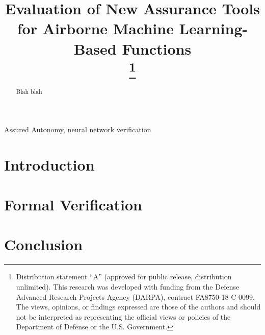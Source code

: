 \documentclass[conference]{IEEEtran}
\begin{document}
\title{Evaluation of New Assurance Tools for Airborne Machine Learning-Based Functions\\
\thanks{Distribution statement ``A'' (approved for public release, distribution unlimited). This research was developed with funding from the Defense Advanced Research Projects Agency (DARPA), contract FA8750-18-C-0099. The views, opinions, or findings expressed are those of the authors and should not be interpreted as representing the official views or policies of the Department of Defense or the U.S. Government.}
}

\author{
}

\maketitle

\begin{abstract}
Blah blah
\end{abstract}

\begin{IEEEkeywords}
Assured Autonomy, neural network verification
\end{IEEEkeywords}

\section{Introduction}
\label{sec:introduction}



\section{Formal Verification}
\label{sec:formalVerification}


\section{Conclusion}
\label{sec:conclusion}



%
%
\end{document}
